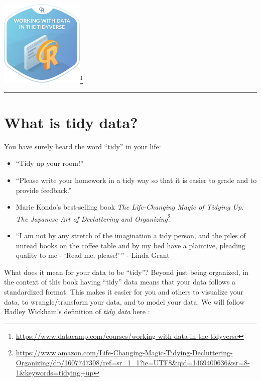 \documentclass[12pt,]{krantz}
\providecommand{\tightlist}{%
  \setlength{\itemsep}{0pt}\setlength{\parskip}{0pt}}
\renewcommand{\href}[2]{#2\footnote{\url{#1}}}
\theoremstyle{definition}
\theoremstyle{definition}
\theoremstyle{definition}
\theoremstyle{remark}
\begin{document}
\begin{center}
\href{https://www.datacamp.com/courses/working-with-data-in-the-tidyverse}{\includegraphics[width=0.3\textwidth]{images/datacamp_working_with_data.png}}
\end{center}

\begin{center}\rule{0.5\linewidth}{\linethickness}\end{center}

\section{What is tidy data?}\label{what-is-tidy-data}

You have surely heard the word ``tidy'' in your life:

\begin{itemize}
\tightlist
\item
  ``Tidy up your room!''
\item
  ``Please write your homework in a tidy way so that it is easier to
  grade and to provide feedback.''
\item
  Marie Kondo's best-selling book
  \href{https://www.amazon.com/Life-Changing-Magic-Tidying-Decluttering-Organizing/dp/1607747308/ref=sr_1_1?ie=UTF8\&qid=1469400636\&sr=8-1\&keywords=tidying+up}{\emph{The
  Life-Changing Magic of Tidying Up: The Japanese Art of Decluttering
  and Organizing}}
\item
  ``I am not by any stretch of the imagination a tidy person, and the
  piles of unread books on the coffee table and by my bed have a
  plaintive, pleading quality to me - `Read me, please!'\,'' - Linda
  Grant
\end{itemize}

What does it mean for your data to be ``tidy''? Beyond just being
organized, in the context of this book having ``tidy'' data means that
your data follows a standardized format. This makes it easier for you
and others to visualize your data, to wrangle/transform your data, and
to model your data. We will follow Hadley Wickham's definition of
\emph{tidy data} here \citep{tidy}:
\end{document}
